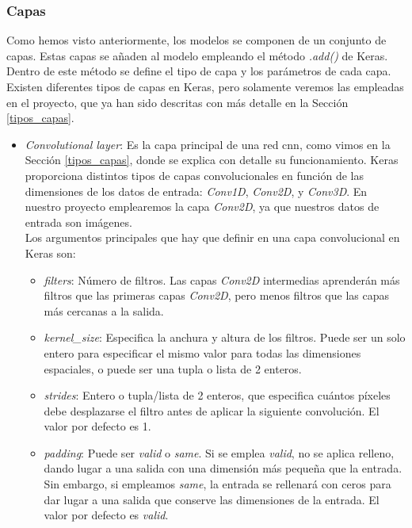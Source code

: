 \subsubsection{Capas}

Como hemos visto anteriormente, los modelos se componen de un conjunto de capas. Estas capas se añaden al modelo empleando el método \textit{.add()} de Keras. Dentro de este método se define el tipo de capa y los parámetros de cada capa. Existen diferentes tipos de capas en Keras, pero solamente veremos las empleadas en el proyecto, que ya han sido descritas con más detalle en la Sección \ref{tipos_capas}.

\begin{itemize}
    \item \textit{Convolutional layer}: Es la capa principal de una red \acrshort{cnn}, como vimos en la Sección \ref{tipos_capas}, donde se explica con detalle su funcionamiento. Keras proporciona distintos tipos de capas convolucionales en función de las dimensiones de los datos de entrada: \textit{Conv1D}, \textit{Conv2D}, y \textit{Conv3D}. En nuestro proyecto emplearemos la capa \textit{Conv2D}, ya que nuestros datos de entrada son imágenes.\\
    
    Los argumentos principales que hay que definir en una capa convolucional en Keras son:
    
        \begin{itemize}
            \item \textit{filters}: Número de filtros. Las capas \textit{Conv2D} intermedias aprenderán más filtros que las primeras capas \textit{Conv2D}, pero menos filtros que las capas más cercanas a la salida. 
            
            \item \textit{kernel\_size}: Especifica la anchura y altura de los filtros. Puede ser un solo entero para especificar el mismo valor para todas las dimensiones espaciales, o puede ser una tupla o lista de 2 enteros.
            
            \item \textit{strides}: Entero o tupla/lista de 2 enteros, que especifica cuántos píxeles debe desplazarse el filtro antes de aplicar la siguiente convolución. El valor por defecto es 1.
            
            \item \textit{padding}: Puede ser \textit{valid} o \textit{same}. Si se emplea \textit{valid}, no se aplica relleno, dando lugar a una salida con una dimensión más pequeña que la entrada. Sin embargo, si empleamos \textit{same}, la entrada se rellenará con ceros para dar lugar a una salida que conserve las dimensiones de la entrada. El valor por defecto es \textit{valid}.


\end{itemize}
\end{itemize}
